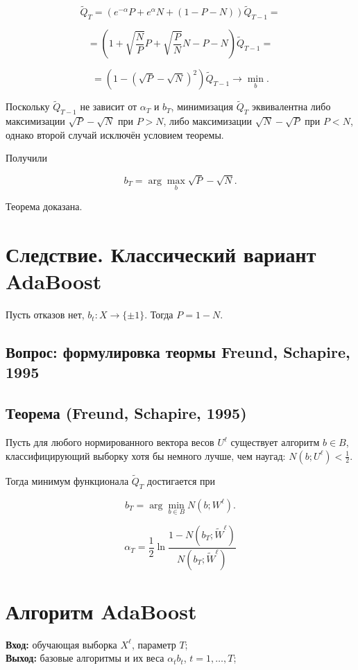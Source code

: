 \[
\widetilde{Q}_T = (e^{-\alpha} P + e^{\alpha} N + (1 - P - N)) \widetilde{Q}_{T-1} = 
\]

\[
= \left(1 + \sqrt{\frac{N}{P}} P + \sqrt{\frac{P}{N}} N - P - N\right) \widetilde{Q}_{T-1} = 
\]

\[
= \left(1 - (\sqrt{P} - \sqrt{N})^2\right) \widetilde{Q}_{T-1} \rightarrow \min_b.
\]

Поскольку \(\widetilde{Q}_{T-1}\) не зависит от \(\alpha_T\) и \(b_T\), минимизация \(\widetilde{Q}_T\) эквивалентна либо максимизации \(\sqrt{P} - \sqrt{N}\) при \(P > N\), либо максимизации \(\sqrt{N} - \sqrt{P}\) при \(P < N\), однако второй случай исключён условием теоремы.

Получили

\[
b_T = \arg \max_b \sqrt{P} - \sqrt{N}.
\]

Теорема доказана.


\section*{Следствие. Классический вариант AdaBoost}

Пусть отказов нет, $b_t : X \to \{ \pm 1 \}$. Тогда $P = 1 - N$.
\subsection*{Вопрос: формулировка теормы Freund, Schapire, 1995}
\subsection*{Теорема (Freund, Schapire, 1995)}

Пусть для любого нормированного вектора весов $U^\ell$ существует алгоритм $b \in B$, классифицирующий выборку хотя бы немного лучше, чем наугад: $N(b; U^\ell) < \frac{1}{2}$.

Тогда минимум функционала $\tilde{Q}_T$ достигается при

\[
b_T = \arg \min_{b \in B} N(b; W^\ell).
\]

\[
\alpha_T = \frac{1}{2} \ln \frac{1 - N(b_T; \tilde{W}^\ell)}{N(b_T; \tilde{W}^\ell)}
\]


\section*{Алгоритм AdaBoost}

\textbf{Вход:} обучающая выборка $X^\ell$, параметр $T$;\\
\textbf{Выход:} базовые алгоритмы и их веса $\alpha_t b_t$, $t = 1, \ldots, T$;

